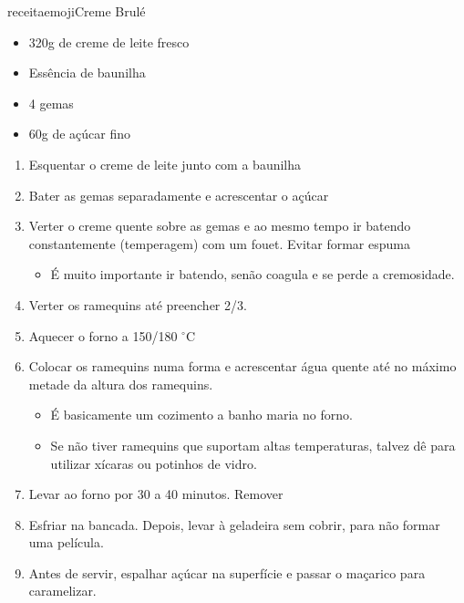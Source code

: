 receitaemoji{Creme Brulé}{
\begin{itemize}
	\item 320g de creme de leite fresco
	\item Essência de baunilha
	\item 4 gemas
	\item 60g de açúcar fino
\end{itemize}
}{
\begin{enumerate}
	\item Esquentar o creme de leite junto com a baunilha
	\item Bater as gemas separadamente e acrescentar o açúcar
	\item Verter o creme quente sobre as gemas e ao mesmo tempo ir batendo
	      constantemente (temperagem) com um fouet. Evitar formar espuma
	      \begin{itemize}
		      \item É muito importante ir batendo, senão coagula e se perde a cremosidade.
	      \end{itemize}
	\item Verter os ramequins até preencher 2/3.
	\item Aquecer o forno a 150/180 $^\circ$C
	\item Colocar os ramequins numa forma e acrescentar água quente até no máximo
	      metade da altura dos ramequins.
	      \begin{itemize}
		      \item É basicamente um cozimento a banho maria no forno.
		      \item Se não tiver ramequins que suportam altas temperaturas, talvez dê para
		            utilizar xícaras ou potinhos de vidro.
	      \end{itemize}
	\item Levar ao forno por 30 a 40 minutos. Remover
	\item Esfriar na bancada. Depois, levar à geladeira sem cobrir, para não
	      formar uma película.
	\item Antes de servir, espalhar açúcar na superfície e passar o maçarico para
	      caramelizar.
\end{enumerate}
}

